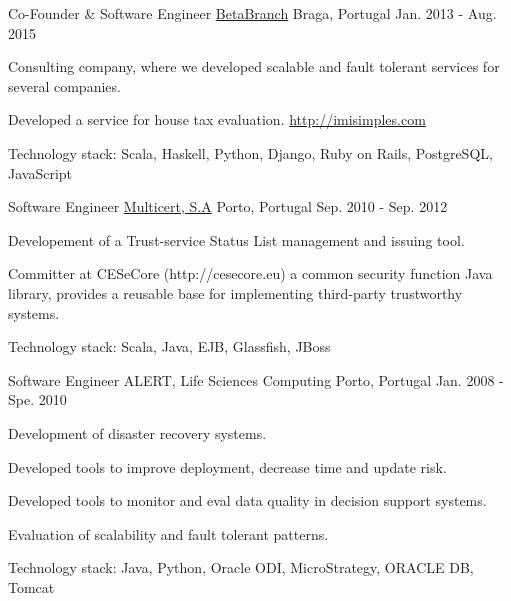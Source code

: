 \begin{cventries}
	\cventry
	{Co-Founder \& Software Engineer} %
	{\href{http://betabranch.com}{BetaBranch}} %
	{Braga, Portugal} %
	{Jan. 2013 - Aug. 2015} %
	{
		\begin{cvitems} %
			\item {Consulting company, where we developed scalable and fault tolerant services for several companies.}
			\item {Developed a service for house tax evaluation. \url{http://imisimples.com}}
			\item {Technology stack: Scala, Haskell, Python, Django, Ruby on Rails, PostgreSQL, JavaScript}
		\end{cvitems}
	}

	\cventry
	{Software Engineer} %
	{\href{https://multicert.com}{Multicert, S.A}} %
	{Porto, Portugal} %
	{Sep. 2010 - Sep. 2012} %
	{
		\begin{cvitems} %
			\item {Developement of a Trust-service Status List management and issuing tool.}
			\item {Committer at CESeCore (http://cesecore.eu) a common security function Java library, provides a reusable base for implementing third-party trustworthy systems.}
			\item {Technology stack: Scala, Java, EJB, Glassfish, JBoss}
		\end{cvitems}
	}

	\cventry
	{Software Engineer} %
	{ALERT, Life Sciences Computing} %
	{Porto, Portugal} %
	{Jan. 2008 - Spe. 2010} %
	{
		\begin{cvitems} %
			\item {Development of disaster recovery systems.}
			\item {Developed tools to improve deployment, decrease time and update risk.}
			\item {Developed tools to monitor and eval data quality in decision support systems.}
			\item {Evaluation of scalability and fault tolerant patterns.}
			\item {Technology stack: Java, Python, Oracle ODI, MicroStrategy, ORACLE DB, Tomcat}
		\end{cvitems}
	}

\end{cventries}
